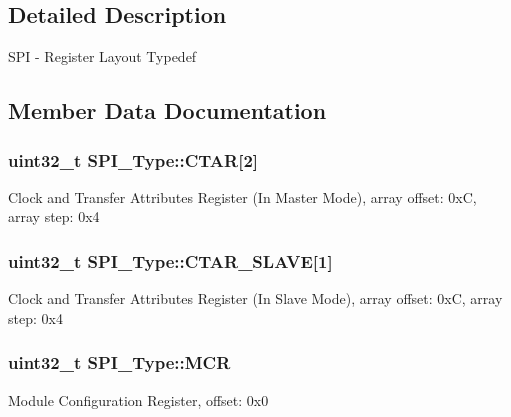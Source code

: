 \subsection{Detailed Description}
S\+PI -\/ Register Layout Typedef 

\subsection{Member Data Documentation}
\subsubsection[{\texorpdfstring{C\+T\+AR}{CTAR}}]{ uint32\+\_\+t S\+P\+I\+\_\+\+Type\+::\+C\+T\+AR\mbox{[}2\mbox{]}}\hypertarget{structSPI__Type_a9bbdd6aba74a5acac2353d20f69cba9c}{}\label{structSPI__Type_a9bbdd6aba74a5acac2353d20f69cba9c}
Clock and Transfer Attributes Register (In Master Mode), array offset\+: 0xC, array step\+: 0x4 
\subsubsection[{\texorpdfstring{C\+T\+A\+R\+\_\+\+S\+L\+A\+VE}{CTAR_SLAVE}}]{ uint32\+\_\+t S\+P\+I\+\_\+\+Type\+::\+C\+T\+A\+R\+\_\+\+S\+L\+A\+VE\mbox{[}1\mbox{]}}\hypertarget{structSPI__Type_a201c3b1742bb0ed045008977151113fa}{}\label{structSPI__Type_a201c3b1742bb0ed045008977151113fa}
Clock and Transfer Attributes Register (In Slave Mode), array offset\+: 0xC, array step\+: 0x4 
\subsubsection[{\texorpdfstring{M\+CR}{MCR}}]{ uint32\+\_\+t S\+P\+I\+\_\+\+Type\+::\+M\+CR}\hypertarget{structSPI__Type_a651ac70598a7c82ab57fc9eb672f3d70}{}\label{structSPI__Type_a651ac70598a7c82ab57fc9eb672f3d70}
Module Configuration Register, offset\+: 0x0 
